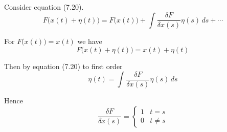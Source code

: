 


\bigskip
Consider equation (7.20).
\begin{equation*}
F\big(x(t)+\eta(t)\big)=F\big(x(t)\big)+\int\frac{\delta F}{\delta x(s)}\eta(s)\,ds+\cdots
\tag{7.20}
\end{equation*}

For $F\big(x(t)\big)=x(t)$ we have
\begin{equation*}
F\big(x(t)+\eta(t)\big)=x(t)+\eta(t)
\end{equation*}

Then by equation (7.20) to first order
\begin{equation*}
\eta(t)=\int\frac{\delta F}{\delta x(s)}\eta(s)\,ds
\end{equation*}

Hence
\begin{equation*}
\frac{\delta F}{\delta x(s)}=
\begin{cases}
1 & t=s
\\
0 & t\ne s
\end{cases}
\end{equation*}


